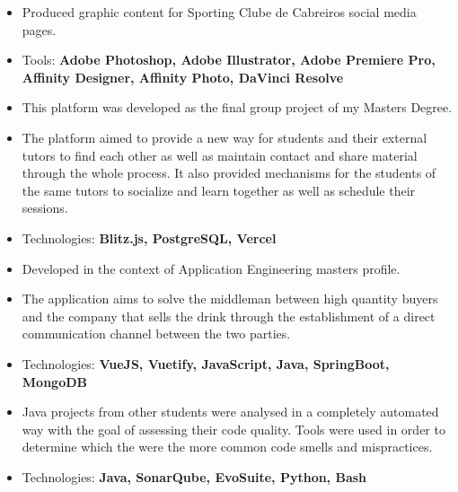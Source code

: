 \documentclass[10pt,a4paper,ragged2e,withhyper]{assets/altacv}
\begin{document}
\begin{paracol}{2}

\begin{itemize}
    \item Produced graphic content for Sporting Clube de Cabreiros social media pages.
    \item Tools: \textbf{Adobe Photoshop, Adobe Illustrator, Adobe Premiere Pro, Affinity Designer, Affinity Photo, DaVinci Resolve}
\end{itemize}

\switchcolumn


\begin{itemize}
    \item This platform was developed as the final group project of my Masters Degree.
    \item The platform aimed to provide a new way for students and their external tutors to find each other as well as maintain contact and share material through the whole process. It also provided mechanisms for the students of the same tutors to socialize and learn together as well as schedule their sessions.
    \item Technologies: \textbf{Blitz.js, PostgreSQL, Vercel}
\end{itemize}

\begin{itemize}
    \item Developed in the context of Application Engineering masters profile.
    \item The application aims to solve the middleman between high quantity buyers and the company that sells the drink through the establishment of a direct communication channel between the two parties.
    \item Technologies: \textbf{VueJS, Vuetify, JavaScript, Java, SpringBoot, MongoDB} 
\end{itemize}

\divider

\begin{itemize}
    \item Java projects from other students were analysed in a completely automated way with the goal of assessing their code quality. Tools were used in order to determine which the were the more common code smells and mispractices.
    \item Technologies: \textbf{Java, SonarQube, EvoSuite, Python, Bash}
\end{itemize}


\end{paracol}
\end{document}
